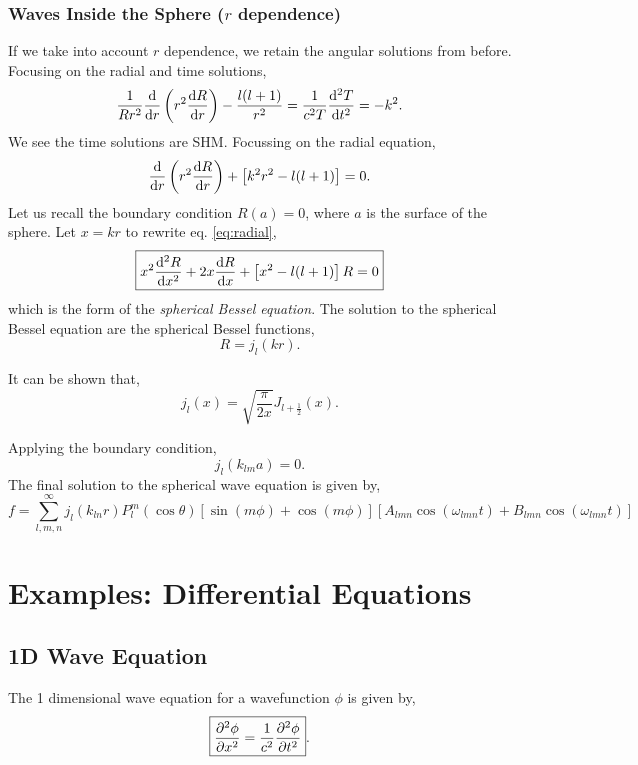 \documentclass{book}
\newenvironment{aside}
{\begin{mdframed}[style=0,%
		leftline=false,rightline=false,leftmargin=2em,rightmargin=2em,%
		innerleftmargin=0pt,innerrightmargin=0pt,linewidth=0.75pt,%
		skipabove=7pt,skipbelow=7pt]\small}
	{\end{mdframed}}
\begin{document}
\subsection{Waves Inside the Sphere ($r$ dependence)}
If we take into account $r$ dependence, we retain the angular solutions from before. Focusing on the radial and time solutions,
\begin{equation}
	\frac{1}{Rr^2}\dv{r}\left(r^2\dv{R}{r}\right) - \frac{l(l+1)}{r^2} = \frac{1}{c^2T}\dv[2]{T}{t} = -k^2. \label{eq:radial}
\end{equation}
We see the time solutions are SHM. Focussing on the radial equation,
\begin{equation}
	\dv{r}\left(r^2\dv{R}{r}\right) + \left[k^2r^2 - l(l+1)\right] = 0.
\end{equation}
Let us recall the boundary condition $R(a) = 0$, where $a$ is the surface of the sphere. Let $x=kr$ to rewrite eq. \eqref{eq:radial},
\begin{equation}
	\boxed{x^2\dv[2]{R}{x} + 2x\dv{R}{x} + \left[x^2 - l(l+1)\right]R = 0}
\end{equation}
which is the form of the \textit{spherical Bessel equation}. The solution to the spherical Bessel equation are the spherical Bessel functions,
\begin{equation}
	R = j_l(kr).
\end{equation}
\begin{aside}
	It can be shown that,
	\begin{equation}
		j_l(x) = \sqrt{\frac{\pi}{2x}}J_{l+\frac{1}{2}}(x).
	\end{equation}
\end{aside}
Applying the boundary condition,
\begin{equation}
	j_l(k_{lm}a) = 0.
\end{equation}
The final solution to the spherical wave equation is given by,
\begin{equation}
	f = \sum_{l,m,n}^{\infty}j_l(k_{ln}r)P_l^m(\cos\theta)\left[\sin(m \phi) + \cos( m \phi)\right]\left[A_{lmn}\cos(\omega_{lmn}t) + B_{lmn}\cos(\omega_{lmn}t)\right]
\end{equation}
\appendix
\chapter{Examples: Differential Equations}
\section{1D Wave Equation}
The 1 dimensional wave equation for a wavefunction $\phi$ is given by,
\begin{equation}
	\boxed{\pdv[2]{\phi}{x} = \frac{1}{c^2}\pdv[2]{\phi}{t}}. \label{eq:1dwave}
\end{equation}
\end{document}
